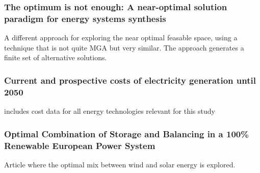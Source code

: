 \subsubsection*{The optimum is not enough: A near-optimal solution paradigm for energy systems synthesis \cite{Optimum_not_enough}}
A different approach for exploring the near optimal feasable space, using a technique that is not quite MGA but very similar. The approach generates a finite set of alternative solutions. 


\subsubsection*{Current and prospective costs of electricity generation until 2050}
\cite{Schroder2013Current} includes cost data for all energy technologies relevant for this study

\subsubsection*{Optimal Combination of Storage and Balancing in a 100\% Renewable European Power System}
\cite{rasmussen2011a}
Article where the optimal mix between wind and solar energy is explored. 

